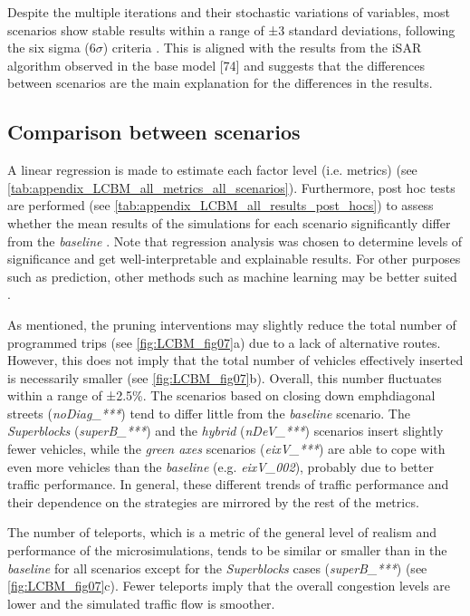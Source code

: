 Despite the multiple iterations and their stochastic variations of variables, most scenarios show stable results within a range of ±3 standard deviations, following the six sigma (6$\sigma$) criteria \citep{Smith1993,Montgomery2008}. This is aligned with the results from the iSAR algorithm observed in the base model [74] \citep{ArgotaSanchez-Vaquerizo2021} and suggests that the differences between scenarios are the main explanation for the differences in the results. 

\subsection{Comparison between scenarios}
\label{subsec:LCBM_3.2_comp_scenarios}

A linear regression is made to estimate each factor level (i.e. metrics) (see \cref{tab:appendix_LCBM_all_metrics_all_scenarios}). Furthermore, post hoc tests are performed (see \cref{tab:appendix_LCBM_all_results_post_hocs}) to assess whether the mean results of the simulations for each scenario significantly differ from the \emph{baseline} \citep{Lee2013,Jafari2019}. Note that regression analysis was chosen to determine levels of significance and get well-interpretable and explainable results. For other purposes such as prediction, other methods such as machine learning may be better suited \citep{Mirzahossein2022,Zargari2022}.

As mentioned, the pruning interventions may slightly reduce the total number of programmed trips (see \cref{fig:LCBM_fig07}a) due to a lack of alternative routes. However, this does not imply that the total number of vehicles effectively inserted is necessarily smaller (see \cref{fig:LCBM_fig07}b). Overall, this number fluctuates within a range of ±2.5\%. The scenarios based on closing down emph{diagonal} streets (\emph{noDiag\_***}) tend to differ little from the \emph{baseline} scenario. The \emph{Superblocks} (\emph{superB\_***}) and the \emph{hybrid} (\emph{nDeV\_***}) scenarios insert slightly fewer vehicles, while the \emph{green axes} scenarios (\emph{eixV\_***}) are able to cope with even more vehicles than the \emph{baseline} (e.g.  \emph{eixV\_002}), probably due to better traffic performance. In general, these different trends of traffic performance and their dependence on the strategies are mirrored by the rest of the metrics.

The number of teleports, which is a metric of the general level of realism and performance of the microsimulations, tends to be similar or smaller than in the \emph{baseline} for all scenarios except for the \emph{Superblocks} cases (\emph{superB\_***}) (see \cref{fig:LCBM_fig07}c). Fewer teleports imply that the overall congestion levels are lower and the simulated traffic flow is smoother.

